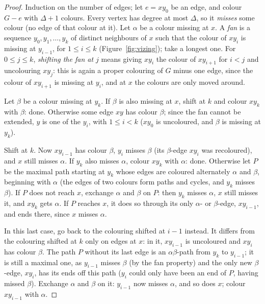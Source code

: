 \begin{proof}
Induction on the number of edges; let $e=xy_0$ be an edge, and colour $G-e$ with $\Delta+1$ colours. Every vertex has degree at most $\Delta$, so it \emph{misses} some colour (no
edge of that colour at it). Let $\alpha$ be a colour missing at $x$. A \emph{fan} is a sequence $y_0,y_1,\dots,y_k$ of distinct neighbours of $x$ such that the colour of $xy_i$ is missing at
$y_{i-1}$, for $1\le i\le k$ (Figure~\ref{fig:vizing}); take a longest one. For $0\le j\le k$, \emph{shifting the fan at $j$} means giving $xy_i$ the colour of $xy_{i+1}$ for $i<j$ and
uncolouring $xy_j$: this is again a proper colouring of $G$ minus one edge, since the colour of $xy_{i+1}$ is missing at $y_i$, and at $x$ the colours are only moved around.

Let $\beta$ be a colour missing at $y_k$. If $\beta$ is also missing at $x$, shift at $k$ and colour $xy_k$ with $\beta$: done. Otherwise some edge $xy$ has colour $\beta$; since the fan
cannot be extended, $y$ is one of the $y_i$, with $1\le i<k$ ($xy_0$ is uncoloured, and $\beta$ is missing at $y_k$).

Shift at $k$. Now $xy_{i-1}$ has colour $\beta$, $y_i$ misses $\beta$ (its $\beta$-edge $xy_i$ was recoloured), and $x$ still misses $\alpha$. If $y_k$ also misses $\alpha$, colour $xy_k$ with $\alpha$:
done. Otherwise let $P$ be the maximal path starting at $y_k$ whose edges are coloured alternately $\alpha$ and $\beta$, beginning with $\alpha$ (the edges of two colours form paths and
cycles, and $y_k$ misses $\beta$). If $P$ does not reach $x$, exchange $\alpha$ and $\beta$ on $P$: then $y_k$ misses $\alpha$, $x$ still misses it, and $xy_k$ gets $\alpha$. If $P$ reaches $x$, it does
so through its only $\alpha$- or $\beta$-edge, $xy_{i-1}$, and ends there, since $x$ misses $\alpha$.

In this last case, go back to the colouring shifted at $i-1$ instead. It differs from the colouring shifted at $k$ only on edges at $x$: in it, $xy_{i-1}$ is uncoloured
and $xy_i$ has colour $\beta$. The path $P$ without its last edge is an $\alpha\beta$-path from $y_k$ to $y_{i-1}$; it is still a maximal one, as $y_{i-1}$ misses $\beta$ (by the fan property)
and the only new $\beta$-edge, $xy_i$, has its ends off this path ($y_i$ could only have been an end of $P$, having missed $\beta$). Exchange $\alpha$ and $\beta$ on it: $y_{i-1}$ now misses
$\alpha$, and so does $x$; colour $xy_{i-1}$ with $\alpha$.
\end{proof}


